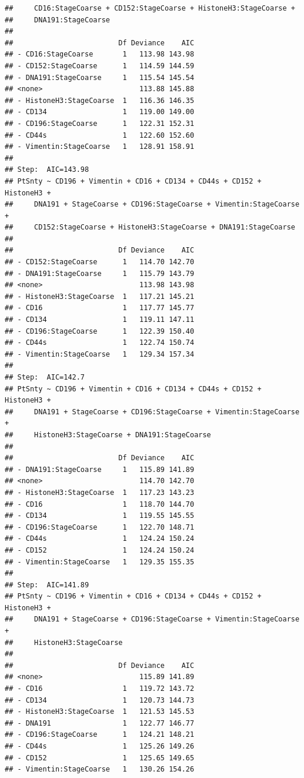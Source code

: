 \documentclass[a4paper]{article}\usepackage[]{graphicx}\usepackage[]{color}
\makeatletter
\newenvironment{kframe}{%
 \def\at@end@of@kframe{}%
 \ifinner\ifhmode%
  \def\at@end@of@kframe{\end{minipage}}%
  \begin{minipage}{\columnwidth}%
 \fi\fi%
 \def\FrameCommand##1{\hskip\@totalleftmargin \hskip-\fboxsep
 \colorbox{shadecolor}{##1}\hskip-\fboxsep
     \hskip-\linewidth \hskip-\@totalleftmargin \hskip\columnwidth}%
 \MakeFramed {\advance\hsize-\width
   \@totalleftmargin\z@ \linewidth\hsize
   \@setminipage}}%
 {\par\unskip\endMakeFramed%
 \at@end@of@kframe}
\newenvironment{knitrout}{}{} %
\makeatother
\begin{document}
\begin{knitrout}
\begin{kframe}
\begin{verbatim}
##     CD16:StageCoarse + CD152:StageCoarse + HistoneH3:StageCoarse + 
##     DNA191:StageCoarse
## 
##                         Df Deviance    AIC
## - CD16:StageCoarse       1   113.98 143.98
## - CD152:StageCoarse      1   114.59 144.59
## - DNA191:StageCoarse     1   115.54 145.54
## <none>                       113.88 145.88
## - HistoneH3:StageCoarse  1   116.36 146.35
## - CD134                  1   119.00 149.00
## - CD196:StageCoarse      1   122.31 152.31
## - CD44s                  1   122.60 152.60
## - Vimentin:StageCoarse   1   128.91 158.91
## 
## Step:  AIC=143.98
## PtSnty ~ CD196 + Vimentin + CD16 + CD134 + CD44s + CD152 + HistoneH3 + 
##     DNA191 + StageCoarse + CD196:StageCoarse + Vimentin:StageCoarse + 
##     CD152:StageCoarse + HistoneH3:StageCoarse + DNA191:StageCoarse
## 
##                         Df Deviance    AIC
## - CD152:StageCoarse      1   114.70 142.70
## - DNA191:StageCoarse     1   115.79 143.79
## <none>                       113.98 143.98
## - HistoneH3:StageCoarse  1   117.21 145.21
## - CD16                   1   117.77 145.77
## - CD134                  1   119.11 147.11
## - CD196:StageCoarse      1   122.39 150.40
## - CD44s                  1   122.74 150.74
## - Vimentin:StageCoarse   1   129.34 157.34
## 
## Step:  AIC=142.7
## PtSnty ~ CD196 + Vimentin + CD16 + CD134 + CD44s + CD152 + HistoneH3 + 
##     DNA191 + StageCoarse + CD196:StageCoarse + Vimentin:StageCoarse + 
##     HistoneH3:StageCoarse + DNA191:StageCoarse
## 
##                         Df Deviance    AIC
## - DNA191:StageCoarse     1   115.89 141.89
## <none>                       114.70 142.70
## - HistoneH3:StageCoarse  1   117.23 143.23
## - CD16                   1   118.70 144.70
## - CD134                  1   119.55 145.55
## - CD196:StageCoarse      1   122.70 148.71
## - CD44s                  1   124.24 150.24
## - CD152                  1   124.24 150.24
## - Vimentin:StageCoarse   1   129.35 155.35
## 
## Step:  AIC=141.89
## PtSnty ~ CD196 + Vimentin + CD16 + CD134 + CD44s + CD152 + HistoneH3 + 
##     DNA191 + StageCoarse + CD196:StageCoarse + Vimentin:StageCoarse + 
##     HistoneH3:StageCoarse
## 
##                         Df Deviance    AIC
## <none>                       115.89 141.89
## - CD16                   1   119.72 143.72
## - CD134                  1   120.73 144.73
## - HistoneH3:StageCoarse  1   121.53 145.53
## - DNA191                 1   122.77 146.77
## - CD196:StageCoarse      1   124.21 148.21
## - CD44s                  1   125.26 149.26
## - CD152                  1   125.65 149.65
## - Vimentin:StageCoarse   1   130.26 154.26

\end{verbatim}
\end{kframe}
\end{knitrout}
\end{document}
